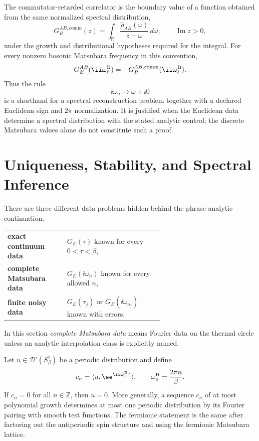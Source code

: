 The commutator-retarded correlator is the boundary value of a function
obtained from the same normalized spectral distribution,
\[
  G_R^{AB,\mathrm{comm}}(z)
  =
  \int_{\mathbb R}
  \frac{\widehat\rho_{AB}(\omega)}{z-\omega}\,d\omega,
  \qquad \operatorname{Im}z>0,
\]
under the growth and distributional hypotheses required for the integral.
For every nonzero bosonic Matsubara frequency in this convention,
\[
  G_E^{AB}(\ii\omega_\ell^{\rm B})
  =
  -G_R^{AB,\mathrm{comm}}(\ii\omega_\ell^{\rm B}).
\]
Thus the rule
\[
  \ii\omega_n\mapsto \omega+\ii0
\]
is a shorthand for a spectral reconstruction problem together with a declared
Euclidean sign and \(2\pi\) normalization.  It is justified when the Euclidean
data determine a spectral distribution with the stated analytic control; the
discrete Matsubara values alone do not constitute such a proof.

\section{Uniqueness, Stability, and Spectral Inference}
\label{sec:thermal-euclidean-reconstruction-stability}

There are three different data problems hidden behind the phrase analytic
continuation.
\begin{center}
\begin{tabular}{@{}lp{0.62\linewidth}@{}}
\textbf{exact continuum data} &
  \(G_E(\tau)\) known for every \(0<\tau<\beta\),\\[0.25em]
\textbf{complete Matsubara data} &
  \(G_E(\ii\omega_n)\) known for every allowed \(n\),\\[0.25em]
\textbf{finite noisy data} &
  \(G_E(\tau_j)\) or \(G_E(\ii\omega_{n_j})\) known with errors.
\end{tabular}
\end{center}
In this section \emph{complete Matsubara data} means Fourier data on the
thermal circle unless an analytic interpolation class is explicitly named.

\begin{theorem}
\label{thm:thermal-circle-fourier-uniqueness}
Let \(u\in\mathcal D'(S^1_\beta)\) be a periodic distribution and define
\[
  c_n=\langle u,\ee^{\ii\omega_n^{\rm B}\tau}\rangle,
  \qquad
  \omega_n^{\rm B}=\frac{2\pi n}{\beta}.
\]
If \(c_n=0\) for all \(n\in\mathbb Z\), then \(u=0\).  More generally, a
sequence \(c_n\) of at most polynomial growth determines at most one
periodic distribution by its Fourier pairing with smooth test functions.
The fermionic statement is the same after factoring out the antiperiodic
spin structure and using the fermionic Matsubara lattice.
\end{theorem}

